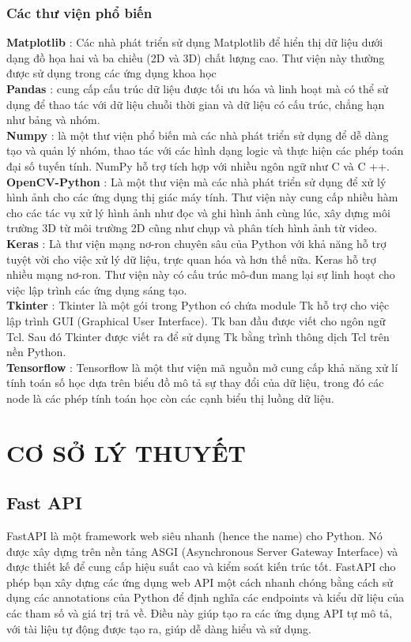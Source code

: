 \documentclass[a4paper]{article}
\begin{document}
\subsubsection{Các thư viện phổ biến}
\indent \textbf{Matplotlib} 
: Các nhà phát triển sử dụng Matplotlib để hiển thị dữ liệu dưới dạng đồ họa hai và ba chiều (2D và 3D) chất lượng cao. Thư viện này thường được sử dụng trong các ứng dụng khoa học
\\
\indent \textbf{Pandas} 
: cung cấp cấu trúc dữ liệu được tối ưu hóa và linh hoạt mà có thể sử dụng để thao tác với dữ liệu chuỗi thời gian và dữ liệu có cấu trúc, chẳng hạn như bảng và nhóm.
\\
\indent \textbf{Numpy} 
: là một thư viện phổ biến mà các nhà phát triển sử dụng để dễ dàng tạo và quản lý nhóm, thao tác với các hình dạng logic và thực hiện các phép toán đại số tuyến tính. NumPy hỗ trợ tích hợp với nhiều ngôn ngữ như C và C ++.
\\
\indent \textbf{OpenCV-Python} 
: Là một thư viện mà các nhà phát triển sử dụng để xử lý hình ảnh cho các ứng dụng thị giác máy tính. Thư viện này cung cấp nhiều hàm cho các tác vụ xử lý hình ảnh như đọc và ghi hình ảnh cùng lúc, xây dựng môi trường 3D từ môi trường 2D cũng như chụp và phân tích hình ảnh từ video.
\\
\indent \textbf{Keras} 
: Là thư viện mạng nơ-ron chuyên sâu của Python với khả năng hỗ trợ tuyệt vời cho việc xử lý dữ liệu, trực quan hóa và hơn thế nữa. Keras hỗ trợ nhiều mạng nơ-ron. Thư viện này có cấu trúc mô-đun mang lại sự linh hoạt cho việc lập trình các ứng dụng sáng tạo.
\\
\indent \textbf{Tkinter} 
: Tkinter là một gói trong Python có chứa module Tk hỗ trợ cho việc lập trình GUI (Graphical User Interface). Tk ban đầu được viết cho ngôn ngữ Tcl. Sau đó Tkinter được viết ra để sử dụng Tk bằng trình thông dịch Tcl trên nền Python.
\\
\indent \textbf{Tensorflow} 
: Tensorflow là một thư viện mã nguồn mở cung cấp khả năng xử lí tính toán số học dựa trên biểu đồ mô tả sự thay đổi của dữ liệu, trong đó các node là các phép tính toán học còn các cạnh biểu thị luồng dữ liệu.

\section{CƠ SỞ LÝ THUYẾT}
\subsection{Fast API}
\indent FastAPI là một framework web siêu nhanh (hence the name) cho Python. Nó được xây dựng trên nền tảng ASGI (Asynchronous Server Gateway Interface) và được thiết kế để cung cấp hiệu suất cao và kiểm soát kiến trúc tốt. FastAPI cho phép bạn xây dựng các ứng dụng web API một cách nhanh chóng bằng cách sử dụng các annotations của Python để định nghĩa các endpoints và kiểu dữ liệu của các tham số và giá trị trả về. Điều này giúp tạo ra các ứng dụng API tự mô tả, với tài liệu tự động được tạo ra, giúp dễ dàng hiểu và sử dụng.
\end{document}
